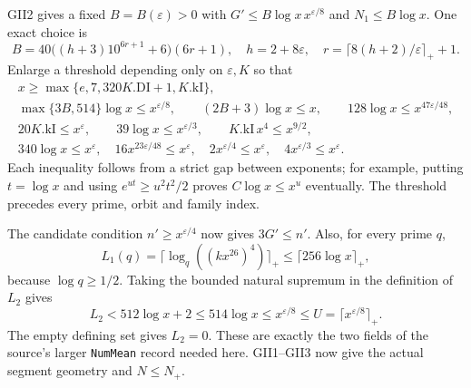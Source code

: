 GII2 gives a fixed $B=B(\varepsilon)>0$ with
$G'\le B\log x\,x^{\varepsilon/8}$ and $N_1\le B\log x$.
One exact choice is
\[
 B=40\bigl((h+3)10^{6r+1}+6\bigr)(6r+1),\quad
 h=2+8\varepsilon,\quad
 r=\lceil8(h+2)/\varepsilon\rceil_++1.
\]
Enlarge a threshold depending only on $\varepsilon,K$ so that
\[
\begin{gathered}
 x\ge\max\{e,7,320K.\mathrm{DI}+1,K.\mathrm{kI}\},\\
 \max\{3B,514\}\log x\le x^{\varepsilon/8},\qquad
 (2B+3)\log x\le x,\qquad
 128\log x\le x^{47\varepsilon/48},\\
 20K.\mathrm{kI}\le x^\varepsilon,\qquad
 39\log x\le x^{\varepsilon/3},\qquad
 K.\mathrm{kI}\,x^4\le x^{9/2},\\
 340\log x\le x^\varepsilon,\quad
 16x^{23\varepsilon/48}\le x^\varepsilon,\quad
 2x^{\varepsilon/4}\le x^\varepsilon,\quad
 4x^{\varepsilon/3}\le x^\varepsilon.
\end{gathered}                                                    \tag{GI.5}
\]
Each inequality follows from a strict gap between exponents;
for example, putting $t=\log x$ and using
$e^{ut}\ge u^2t^2/2$ proves $C\log x\le x^u$ eventually.
The threshold precedes every prime, orbit and family index.

The candidate condition $n'\ge x^{\varepsilon/4}$ now gives
$3G'\le n'$. Also, for every prime $q$,
\[
 L_1(q)=\lceil\log_q((kx^{26})^4)\rceil_+
       \le\lceil256\log x\rceil_+,
\]
because $\log q\ge1/2$. Taking the bounded natural supremum
in the definition of $L_2$ gives
\[
 L_2<512\log x+2\le514\log x
       \le x^{\varepsilon/8}\le U=\lceil x^{\varepsilon/8}\rceil_+.
                                                               \tag{GI.6}
\]
The empty defining set gives $L_2=0$. These are exactly the two
fields of the source's larger \texttt{NumMean} record needed
here. GII1--GII3 now give the actual segment geometry and
$N\le N_+$.

